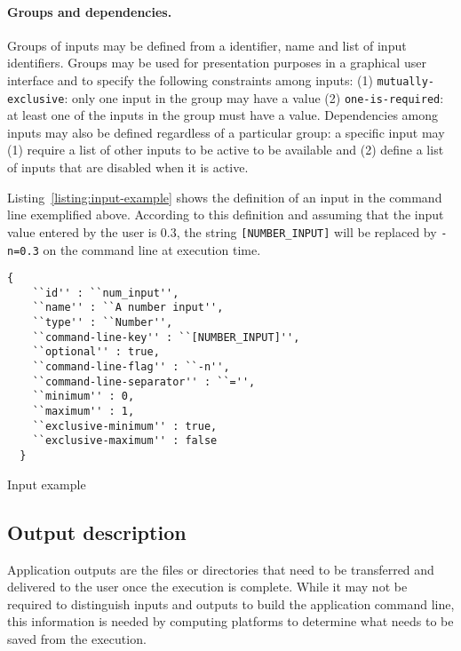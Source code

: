 \documentclass{article}
\begin{document}
\paragraph{Groups and dependencies.} Groups of inputs may be defined
from a identifier, name and list of input identifiers. Groups may be
used for presentation purposes in a graphical user interface and to
specify the following constraints among inputs: (1)
\texttt{mutually-exclusive}: only one input in the group may have a
value (2) \texttt{one-is-required}: at least one of the inputs in the
group must have a value. Dependencies among inputs may also be defined
regardless of a particular group: a specific input may (1) require a
list of other inputs to be active to be available and (2) define a
list of inputs that are disabled when it is active.

Listing~\ref{listing:input-example} shows the definition of an input
in the command line exemplified above. According to this definition
and assuming that the input value entered by the user is 0.3, the
string \texttt{[NUMBER\_INPUT]} will be replaced by \texttt{-n=0.3} on
the command line at execution time.
\begin{listing}
\begin{verbatim}
{
    ``id'' : ``num_input'',
    ``name'' : ``A number input'',
    ``type'' : ``Number'',
    ``command-line-key'' : ``[NUMBER_INPUT]'',
    ``optional'' : true,
    ``command-line-flag'' : ``-n'',
    ``command-line-separator'' : ``='',
    ``minimum'' : 0,
    ``maximum'' : 1,
    ``exclusive-minimum'' : true,
    ``exclusive-maximum'' : false
  }
\end{verbatim}
\caption{Input example} 
\label{listing:input-example}
\end{listing}

\subsection{Output description}

Application outputs are the files or directories that need to be
transferred and delivered to the user once the execution is
complete. While it may not be required to distinguish inputs and
outputs to build the application command line, this information is
needed by computing platforms to determine what needs to be saved from
the execution. 
\end{document}

